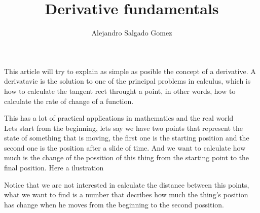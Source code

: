 \documentclass[12pt,journal]{IEEEtran}
\begin{document}
    \title{Derivative fundamentals}
    \author{Alejandro Salgado Gomez}

    \maketitle

    This article will try to explain as simple as posible the concept of a
    derivative. A derivatavie is the solution to one of the principal
    problems in calculus, which is how to calculate the tangent rect throught
    a point, in other words, how to calculate the rate of change of a function.

    This has a lot of practical applications in mathematics and the real
    world\\

    Lets start from the beginning, lets say we have two points that represent
    the state of something that is moving, the first one is the starting
    position and the second one is the position after a slide of time. And we
    want to calculate how much is the change of the possition of this thing
    from the starting point to the final position. Here a ilustration\\


    Notice that we are not interested in calculate the distance between this
    points, what we want to find is a number that decribes how much the thing's
    position has change when he moves from the beginning to the second possition.
\end{document}
